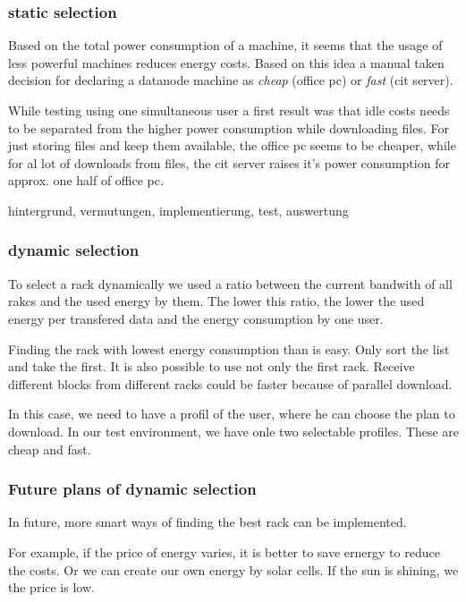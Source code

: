 \subsubsection{static selection}

Based on the total power consumption of a machine, it seems that the usage of less powerful machines reduces energy costs. Based on this idea a manual taken decision for declaring a datanode machine as \textit{cheap} (office pc) or \textit{fast} (cit server). 

While testing using one simultaneous user a first result was that idle costs needs to be separated from the higher power consumption while downloading files. For just storing files and keep them available, the office pc seems to be cheaper, while for al lot of downloads from files, the cit server raises it's power consumption for approx. one half of office pc.



hintergrund, vermutungen, implementierung, test, auswertung

\subsubsection{dynamic selection}

To select a rack dynamically we used a ratio between the current bandwith of all rakcs and the used energy by them. The lower this ratio, the lower the used energy per transfered data and the energy consumption by one user.

Finding the rack with lowest energy consumption than is easy. Only sort the list and take the first. It is also possible to use not only the first rack. Receive different blocks from different racks could be faster because of parallel download.

In this case, we need to have a profil of the user, where he can choose the plan to download. In our test environment, we have onle two selectable profiles. These are cheap and fast.

\subsubsection{Future plans of dynamic selection}

In future, more smart ways of finding the best rack can be implemented. 

For example, if the price of energy varies, it is better to save ernergy to reduce the costs. Or we can create our own energy by solar cells. If the sun is shining, we the price is low.

